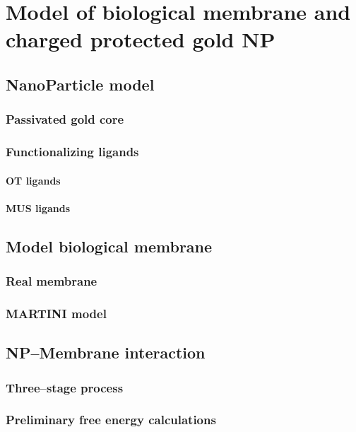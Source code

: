 \chapter{Model of biological membrane and charged protected gold NP}

\section{NanoParticle model}


\subsection{Passivated gold core}


\subsection{Functionalizing ligands}


\subsubsection{OT ligands}

\subsubsection{MUS ligands} %

\section{Model biological membrane}

\subsection{Real membrane}

\subsection{MARTINI model}

\section{NP--Membrane interaction}

\subsection{Three--stage process}

\subsection{Preliminary free energy calculations}